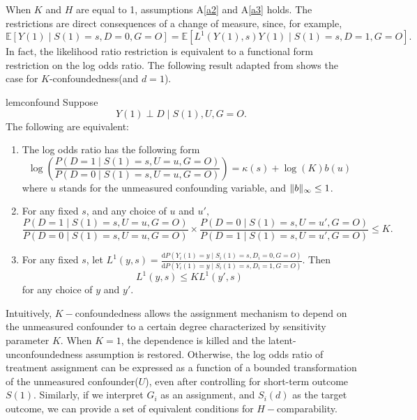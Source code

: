 \documentclass[12pt]{article}
\newcommand{\Ep}{\mathbb{E}}
\DeclarePairedDelimiter{\norm}{\lVert}{\rVert}
\begin{document}
	When $K$ and $H$ are equal to 1, assumptions A\ref{a2} and A\ref{a3} holds. The restrictions are direct consequences of a change of measure, since, for example, $$\Ep[Y(1) \mid S(1) = s, D = 0, G = O] = \Ep[L^1(Y(1),s) Y(1) \mid S(1) = s, D = 1, G = O].$$ In fact, the likelihood ratio restriction is equivalent to a functional form restriction on the log odds ratio. 
	The following result adapted from \textcite{yadlowsky2018bounds} shows the case for $K$-confoundedness(and $d = 1$).
	
	\begin{restatable}{lem}{confound}
		\label{confound}
		Suppose $$Y(1) \perp D \mid S(1), U, G = O.$$
		The following are equivalent:
		\begin{enumerate}[label=(\alph*)]
			\item The log odds ratio has the following form $$\log \left(\frac{P(D=1 \mid S(1) = s, U=u, G = O)}{P(D=0 \mid S(1)=s, U=u, G = O)}\right)=\kappa(s)+\log (K) b(u)$$
			where $u$ stands for the unmeasured confounding variable, and $\norm{b}_{\infty} \leq 1$.

			\item For any fixed $s$, and any choice of $u$ and $u',$ $$\frac{P(D=1 \mid S(1) = s, U=u, G =O)}{P(D=0 \mid S(1)=s, U=u, G = O)} \times\frac{P(D=0 \mid S(1) = s, U=u', G =O)}{P(D=1 \mid S(1)=s, U=u', G = O)} \leq K.$$
			
			\item For any fixed $s$, let $L^1(y,s) = \frac{\mathrm{d} P(Y_i(1) = y \mid S_i(1) = s, D_i = 0, G = O)}{\mathrm{d} P(Y_i(1) = y \mid S_i(1) = s, D_i = 1, G = O)}$. Then $$L^1(y,s) \leq K L^1(y',s)$$ for any choice of $y$ and $y'$.
		\end{enumerate}
	\end{restatable}
	    
	Intuitively, $K-$confoundedness allows the assignment mechanism to depend on the unmeasured confounder to a certain degree characterized by sensitivity parameter $K$. When $K = 1$, the dependence is killed and the latent-unconfoundedness assumption is restored. Otherwise, the log odds ratio of treatment assignment can be expressed as a function of a bounded transformation of the unmeasured confounder($U$), even after controlling for short-term outcome $S(1)$. Similarly, if we interpret $G_i$ as an assignment, and $S_i(d)$ as the target outcome, we can provide a set of equivalent conditions for $H-$comparability.
\end{document}
